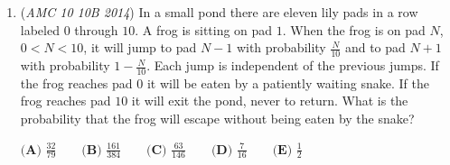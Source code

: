 \begin{enumerate}
 $\textbf {(A) } 1 \qquad \textbf {(B) } 2 \qquad \textbf {(C) } 3 \qquad \textbf {(D) } 4 \qquad \textbf {(E) } 5$


	\item (\textit{AMC 10 10B 2014}) In a small pond there are eleven lily pads in a row labeled $0$ through $10$. A frog is sitting on pad $1$. When the frog is on pad $N$, $0<N<10$, it will jump to pad $N-1$ with probability $\frac{N}{10}$ and to pad $N+1$ with probability $1-\frac{N}{10}$. Each jump is independent of the previous jumps. If the frog reaches pad $0$ it will be eaten by a patiently waiting snake. If the frog reaches pad $10$ it will exit the pond, never to return. What is the probability that the frog will escape without being eaten by the snake?


 $\textbf {(A) } \frac{32}{79} \qquad \textbf {(B) } \frac{161}{384} \qquad \textbf {(C) } \frac{63}{146} \qquad \textbf {(D) } \frac{7}{16} \qquad \textbf {(E) } \frac{1}{2}$


\end{enumerate}